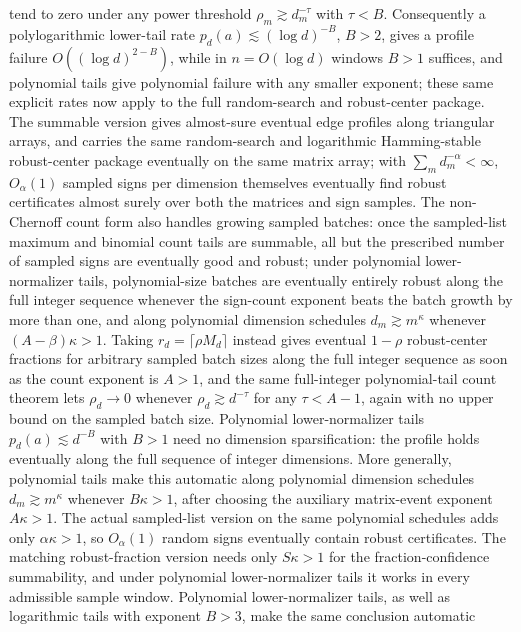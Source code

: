 \documentclass[11pt]{article}
\begin{document}
tend to zero under any power threshold \(\rho_m\gtrsim d_m^{-\tau}\) with
\(\tau<B\).
Consequently a polylogarithmic
lower-tail rate \(p_d(a)\lesssim(\log d)^{-B}\), \(B>2\), gives a profile
failure \(O((\log d)^{2-B})\), while in \(n=O(\log d)\) windows \(B>1\)
suffices, and polynomial tails give polynomial failure with any smaller
exponent; these same explicit rates now apply to the full random-search and
robust-center package.  The summable version gives almost-sure eventual edge profiles along
triangular arrays, and carries the same random-search and logarithmic
Hamming-stable robust-center package eventually on the same matrix array; with
\(\sum_m d_m^{-\alpha}<\infty\), \(O_\alpha(1)\) sampled signs per dimension
themselves eventually find robust certificates almost surely over both the
matrices and sign samples.  The non-Chernoff count form also handles growing
sampled batches: once the sampled-list maximum and binomial count tails are
summable, all but the prescribed number of sampled signs are eventually good and
robust; under polynomial lower-normalizer tails, polynomial-size batches are
eventually entirely robust along the full integer sequence whenever the
sign-count exponent beats the batch growth by more than one, and along
polynomial dimension schedules \(d_m\gtrsim m^\kappa\) whenever
\((A-\beta)\kappa>1\).  Taking \(r_d=\lceil\rho M_d\rceil\) instead gives
eventual \(1-\rho\) robust-center fractions for arbitrary sampled batch sizes
along the full integer sequence as soon as the count exponent is \(A>1\), and
the same full-integer polynomial-tail count theorem lets \(\rho_d\to0\) whenever
\(\rho_d\gtrsim d^{-\tau}\) for any \(\tau<A-1\), again with no upper bound on
the sampled batch size.
Polynomial lower-normalizer tails \(p_d(a)\lesssim d^{-B}\)
with \(B>1\) need no dimension sparsification: the profile holds eventually
along the full sequence of integer dimensions.  More generally, polynomial tails
make this automatic along polynomial dimension schedules
\(d_m\gtrsim m^\kappa\) whenever \(B\kappa>1\), after choosing the auxiliary
matrix-event exponent \(A\kappa>1\).  The actual sampled-list version on the
same polynomial schedules adds only \(\alpha\kappa>1\), so \(O_\alpha(1)\)
random signs eventually contain robust certificates.  The matching
robust-fraction version needs only \(S\kappa>1\) for the fraction-confidence
summability, and under polynomial lower-normalizer tails it works in every
admissible sample window.  Polynomial lower-normalizer tails, as well
as logarithmic tails with exponent \(B>3\), make the same conclusion automatic
\end{document}
